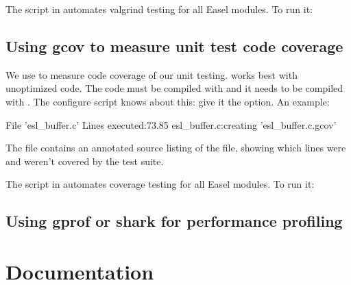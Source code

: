 The  script in  automates
valgrind testing for all Easel modules. To run it:

\begin{cchunk} 
\end{cchunk}




\subsection{Using gcov to measure unit test code coverage}

We use  to measure code coverage of our unit
testing.  works best with unoptimized code.  The code
must be compiled with  and it needs to be compiled with
. The configure script knows
about this: give it the  option. An example:

\begin{cchunk}
  File 'esl_buffer.c'
  Lines executed:73.85%
  esl_buffer.c:creating 'esl_buffer.c.gcov'
\end{cchunk}

The file  contains an annotated source listing
of the  file, showing which lines were and weren't covered
by the test suite.

The  script in  automates coverage
testing for all Easel modules. To run it:

\begin{cchunk} 
\end{cchunk}


\subsection{Using gprof or shark for performance profiling}



\section{Documentation}

